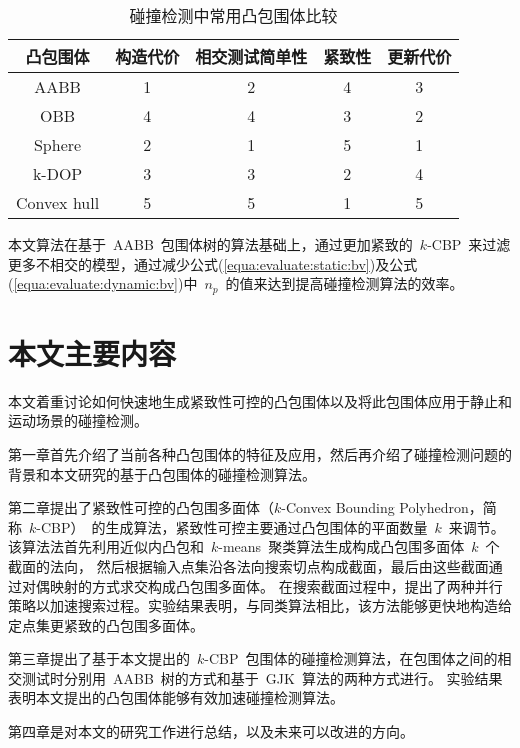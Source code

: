 \begin{table}[htbp]
\centering
\caption{碰撞检测中常用凸包围体比较}
\begin{tabular}{ccccc}
\toprule[1.5pt]
凸包围体 & 构造代价 & 相交测试简单性 & 紧致性 & 更新代价\\
\midrule[1.0pt]
AABB   & 1 & 2 & 4 & 3\\
OBB    & 4 & 4 & 3 & 2\\
Sphere & 2 & 1 & 5 & 1\\
k-DOP  & 3 & 3 & 2 & 4\\
Convex hull & 5 & 5 & 1 & 5 \\
\bottomrule[1.5pt]
\end{tabular}
\label{lbl:table:bv-comp}
\end{table}

本文算法在基于~AABB~包围体树的算法基础上，通过更加紧致的~$k$-CBP~来过滤更多不相交的模型，通过减少公式(\ref{equa:evaluate:static:bv})及公式(\ref{equa:evaluate:dynamic:bv})中~$n_p$~的值来达到提高碰撞检测算法的效率。

\section{本文主要内容}
\label{sec:structure}
本文着重讨论如何快速地生成紧致性可控的凸包围体以及将此包围体应用于静止和运动场景的碰撞检测。

第一章首先介绍了当前各种凸包围体的特征及应用，然后再介绍了碰撞检测问题的背景和本文研究的基于凸包围体的碰撞检测算法。

第二章提出了紧致性可控的凸包围多面体（$k$-Convex Bounding Polyhedron，简称~$k$-CBP）~的生成算法，紧致性可控主要通过凸包围体的平面数量~$k$~来调节。
该算法法首先利用近似内凸包和~$k$-means~聚类算法生成构成凸包围多面体~$k$~个截面的法向，
然后根据输入点集沿各法向搜索切点构成截面，最后由这些截面通过对偶映射的方式求交构成凸包围多面体。
在搜索截面过程中，提出了两种并行策略以加速搜索过程。实验结果表明，与同类算法相比，该方法能够更快地构造给定点集更紧致的凸包围多面体。

第三章提出了基于本文提出的~$k$-CBP~包围体的碰撞检测算法，在包围体之间的相交测试时分别用~AABB~树的方式和基于~GJK~算法的两种方式进行。
实验结果表明本文提出的凸包围体能够有效加速碰撞检测算法。

第四章是对本文的研究工作进行总结，以及未来可以改进的方向。
